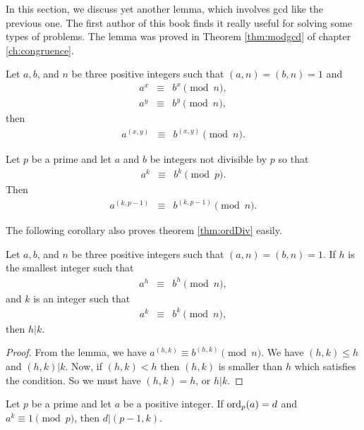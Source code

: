 \documentclass{subfile}
\begin{document}
	In this section, we discuss yet another lemma, which involves gcd like the previous one. The first author of this book finds it really useful for solving some types of problems. The lemma was proved in Theorem \eqref{thm:modgcd} of chapter \eqref{ch:congruence}.
		\begin{lemma}
			Let $a, b$, and $n$ be three positive integers such that $(a,n)=(b,n)=1$ and
				\begin{eqnarray*}
					a^x &\equiv& b^x\pmod n,\\
					a^y &\equiv& b^y\pmod n,
				\end{eqnarray*}
			then
				\begin{eqnarray*}
					a^{(x,y)} &\equiv& b^{(x,y)}\pmod n.
				\end{eqnarray*}
		\end{lemma}

		\begin{corollary}
			Let $p$ be a prime and let $a$ and $b$ be integers not divisible by $p$ so that
				\begin{eqnarray*}
					a^k &\equiv& b^k\pmod p.
				\end{eqnarray*}
			Then
				\begin{eqnarray*}
					a^{(k,p-1)} &\equiv& b^{(k,p-1)}\pmod n.
				\end{eqnarray*}
		\end{corollary}

	The following corollary also proves theorem \eqref{thm:ordDiv} easily.
		\begin{corollary}
			Let $a, b$, and $n$ be three positive integers such that $(a,n)=(b,n)=1$. If $h$ is the smallest integer such that
				\begin{eqnarray*}
					a^h &\equiv& b^h\pmod n,
				\end{eqnarray*}
			and $k$ is an integer such that
				\begin{eqnarray*}
					a^k &\equiv& b^k\pmod n,
				\end{eqnarray*}
			then $h|k$.
		\end{corollary}

		\begin{proof}
			From the lemma, we have $a^{(h,k)}\equiv b^{(h,k)}\pmod n$. We have $(h,k)\leq h$ and $(h,k)|k$. Now, if $(h,k)<h$ then $(h,k)$ is smaller than $h$ which satisfies the condition. So we must have $(h,k)=h$, or $h|k$.
		\end{proof}

		\begin{corollary}\label{cor:cor2}
			Let $p$ be a prime and let $a$ be a positive integer. If $\operatorname{ord}_p(a)=d$ and $a^k\equiv1\pmod p$, then $d|(p-1,k)$.
		\end{corollary}
\end{document}
